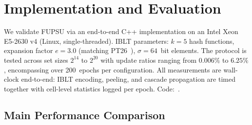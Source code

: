 \section{Implementation and Evaluation}
\label{sec:eval}

We validate FUPSU via an end-to-end C++ implementation on an Intel Xeon
E5-2630 v4 (Linux, single-threaded). IBLT parameters: $k = 5$ hash
functions, expansion factor $e = 3.0$ (matching PT26~\cite{PT26}),
$\sigma = 64$~bit elements. The protocol is tested across set sizes
$2^{14}$ to $2^{20}$ with update ratios ranging from $0.006\%$ to $6.25\%$,
encompassing over 200~epochs per configuration. All measurements are
wall-clock end-to-end: IBLT encoding, peeling, and cascade propagation
are timed together with cell-level statistics logged per epoch.
Code:~\cite{code}.

\subsection{Main Performance Comparison}

